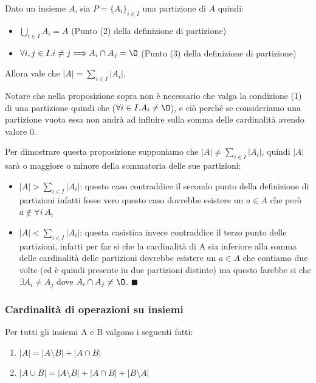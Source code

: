 \begin{lemma}[Lemma-x]\label{lemma-x}
Dato un insieme $A$, sia $P = \{A_i\}_{i \in I}$ una partizione di $A$ quindi:
\begin{itemize}
    \item $\bigcup\limits_{i \in I}A_i = A$ (Punto (2) della definizione di partizione)
    \item $\forall i,j \in I . i\neq j \Longrightarrow A_i \cap A_j = \O$ (Punto (3) della definizione di partizione)
\end{itemize}
Allora vale che $\lvert A\rvert = \sum\limits_{i\in I}\lvert A_i\rvert$.
\end{lemma}
\begin{note}
Notare che nella proposizione sopra non è necessario che valga la condizione (1) di una partizione quindi che ($\forall i \in I . A_i \neq \O$), e ciò perché se consideriamo una partizione vuota essa non andrà ad influire sulla somma delle cardinalità avendo valore 0. 
\end{note}
\begin{demostration}
Per dimostrare questa proposizione supponiamo che $|A| \neq \sum\limits_{i\in I}|A_i|$, quindi $|A|$ sarà o maggiore o minore della sommatoria delle sue partizioni:
\begin{itemize}
    \item $|A| > \sum\limits_{i\in I}|A_i|$: questo caso contraddice il secondo punto della definizione di partizioni infatti fosse vero questo caso dovrebbe esistere un $a \in A$ che però $a \notin \forall i \: A_i$
    \item $|A| < \sum\limits_{i\in I}|A_i|$: questa casistica invece contraddice il terzo punto delle partizioni, infatti per far si che la cardinalità di A sia inferiore alla somma delle cardinalità delle partizioni dovrebbe esistere un $a \in A$ che contiamo due volte (ed è quindi presente in due partizioni distinte) ma questo farebbe si che $\exists A_i \neq A_j$ dove $A_i \cap A_j \neq \O$. $\blacksquare$
\end{itemize}
\end{demostration}

\subsubsection{Cardinalità di operazioni su insiemi}
\begin{proposition}
Per tutti gli insiemi A e B valgono i seguenti fatti:
\begin{enumerate}
    \item $|A| = |A\setminus B| + |A\cap B|$
    \item $|A \cup B| = |A\setminus B| + |A \cap B| + |B \setminus A|$
\end{enumerate}
\end{proposition}

